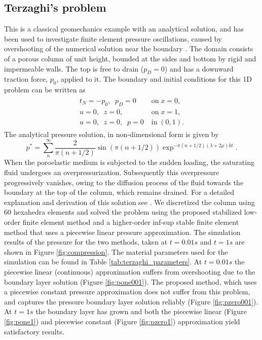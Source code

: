 
\subsection{Terzaghi's problem}
\label{sec:Terzaghi}

This is a classical geomechanics example with an analytical solution, and has been used to investigate finite element pressure oscillations, caused by overshooting of the numerical solution near the boundary \cite{murad1994stability,white2008stabilized}. The domain consists of a porous column of unit height, bounded at the sides and bottom by rigid and impermeable walls. The top is free to drain ($p_{D}=0$) and has a downward traction force, $p_{0}$, applied to it. The boundary and initial conditions for this 1D problem can be written as
\begin{equation}
\begin{gathered}\begin{aligned}
t_{N} = -p_{0},\;\;p_{D}=0\;\;  &\mbox{on} \; x=0,\\
u=0,\;\;z=0,\;\; &\mbox{on} \; x=1, \\
u=0,\;\;z=0,\;\;p=0 \; &\mbox{in} \; (0,1).
\end{aligned}\end{gathered}
\label{eqn:compression}
\end{equation}
The analytical pressure solution, in non-dimensional form is given by
\begin{equation}
p^{*}=\sum_{n}^{\infty}\frac{2}{\pi(n+1/2)} \sin (\pi(n+1/2)) \exp^{-\pi(n+1/2)(\lambda+2\mu)k t}.
\end{equation}
When the poroelastic medium is subjected to the sudden loading, the saturating fluid undergoes an overpressurization. Subsequently this overpressure progressively vanishes, owing to the
diffusion process of the fluid towards the boundary at the top of the column, which remains drained. For a detailed explanation and derivation of this solution see \cite[section 5.2.2]{wriggers2008nonlinear}. We discretized the column using 60 hexahedra elements and solved the problem using the proposed stabilized low-order finite element method and a higher-order inf-sup stable finite element method that uses a piecewise linear pressure approximation. The simulation results of the pressure for the two methods, taken at $t=0.01s$ and $t=1s$ are shown in Figure \ref{fig:compression}. The material parameters used for the simulation can be found in Table \ref{tab:terzaghi_parameters}. At $t=0.01s$ the piecewise linear (continuous) approximation suffers from overshooting due to the boundary layer solution (Figure \ref{fig:pone001}). The proposed method, which uses a piecewise constant pressure approximation does not suffer from this problem, and captures the pressure boundary layer solution reliably (Figure \ref{fig:pzero001}). At $t=1s$ the boundary layer has grown and both the piecewise linear (Figure \ref{fig:pone1}) and piecewise constant (Figure \ref{fig:pzero1}) approximation yield satisfactory results.

